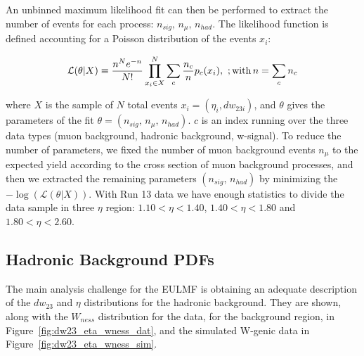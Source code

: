 An unbinned maximum likelihood fit can then be performed to extract the number
of events for each process: $n_{sig},\,n_\mu,\, n_{had}$. The likelihood
function is defined accounting for a Poisson  distribution of the events $x_i$:

\begin{equation} 
  \mathcal{L}(\theta|X) 
  \equiv
  \frac{n^N e^{-n}}{N!} \prod_{x_i \in X}^N
  \sum_c \frac{n_c}{n} p_c (x_i), \
  ;{\rm with}\, 
  n=\sum_c n_c 
  \label{eq:likelihood_function}
\end{equation} 

where $X$ is the sample of $N$ total events $x_i = (\eta_i,dw_{23i})$, and
$\theta$ gives the parameters of the fit $\theta = (n_{sig},\,n_\mu,\,
n_{had})$.  $c$ is an index running over the three data types (muon background,
hadronic background, w-signal). To reduce the number of parameters, we fixed the
number of muon background events $n_\mu$ to the expected yield according to the
cross section of muon background processes, and then we extracted the remaining
parameters $(n_{sig},\, n_{had})$ by minimizing the
$-\log(\mathcal{L}(\theta|X))$.  With Run 13 data we have enough statistics to
divide the data sample in three $\eta$ region: $1.10 < \eta < 1.40$, $1.40 <
\eta < 1.80$ and $1.80 < \eta < 2.60$. 

\subsection{Hadronic Background PDFs}

The main analysis challenge for the EULMF is obtaining an adequate description
of the $dw_{23}$ and $\eta$ distributions for the hadronic background. They are
shown, along with the $W_{ness}$ distribution for the data, for the background
region, in Figure~\ref{fig:dw23_eta_wness_dat}, and the simulated W-genic data
in Figure~\ref{fig:dw23_eta_wness_sim}.

